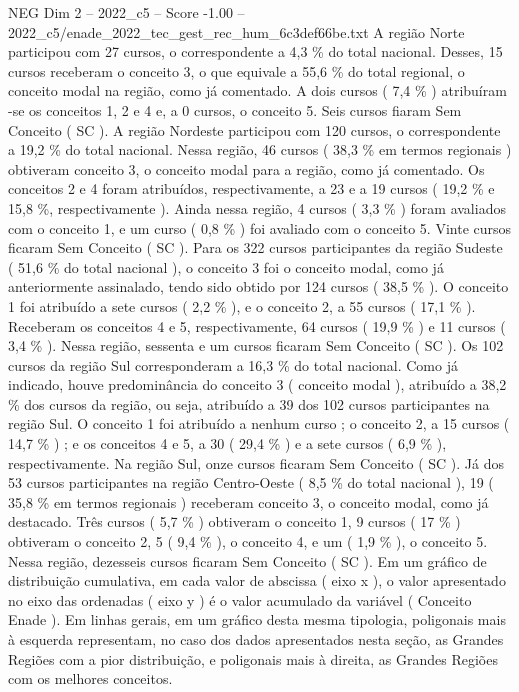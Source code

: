 \begin{textsample}{NEG Dim 2 – 2022\_c5 – Score -1.00 – 2022\_c5/enade\_2022\_tec\_gest\_rec\_hum\_6c3def66be.txt}
A região Norte participou com 27 cursos, o correspondente a 4,3 \% do total nacional.
Desses, 15 cursos receberam o conceito 3, o que equivale a 55,6 \% do total regional, o conceito modal na região, como já comentado.
A dois cursos ( 7,4 \% ) atribuíram -se os conceitos 1, 2 e 4 e, a 0 cursos, o conceito 5.
Seis cursos fiaram Sem Conceito ( SC ).
A região Nordeste participou com 120 cursos, o correspondente a 19,2 \% do total nacional.
Nessa região, 46 cursos ( 38,3 \% em termos regionais ) obtiveram conceito 3, o conceito modal para a região, como já comentado.
Os conceitos 2 e 4 foram atribuídos, respectivamente, a 23 e a 19 cursos ( 19,2 \% e 15,8 \%, respectivamente ).
Ainda nessa região, 4 cursos ( 3,3 \% ) foram avaliados com o conceito 1, e um curso ( 0,8 \% ) foi avaliado com o conceito 5.
Vinte cursos ficaram Sem Conceito ( SC ).
Para os 322 cursos participantes da região Sudeste ( 51,6 \% do total nacional ), o conceito 3 foi o conceito modal, como já anteriormente assinalado, tendo sido obtido por 124 cursos ( 38,5 \% ).
O conceito 1 foi atribuído a sete cursos ( 2,2 \% ), e o conceito 2, a 55 cursos ( 17,1 \% ).
Receberam os conceitos 4 e 5, respectivamente, 64 cursos ( 19,9 \% ) e 11 cursos ( 3,4 \% ).
Nessa região, sessenta e um cursos ficaram Sem Conceito ( SC ).
Os 102 cursos da região Sul corresponderam a 16,3 \% do total nacional.
Como já indicado, houve predominância do conceito 3 ( conceito modal ), atribuído a 38,2 \% dos cursos da região, ou seja, atribuído a 39 dos 102 cursos participantes na região Sul.
O conceito 1 foi atribuído a nenhum curso ; o conceito 2, a 15 cursos ( 14,7 \% ) ; e os conceitos 4 e 5, a 30 ( 29,4 \% ) e a sete cursos ( 6,9 \% ), respectivamente.
Na região Sul, onze cursos ficaram Sem Conceito ( SC ).
Já dos 53 cursos participantes na região Centro-Oeste ( 8,5 \% do total nacional ), 19 ( 35,8 \% em termos regionais ) receberam conceito 3, o conceito modal, como já destacado.
Três cursos ( 5,7 \% ) obtiveram o conceito 1, 9 cursos ( 17 \% ) obtiveram o conceito 2, 5 ( 9,4 \% ), o conceito 4, e um ( 1,9 \% ), o conceito 5.
Nessa região, dezesseis cursos ficaram Sem Conceito ( SC ).
Em um gráfico de distribuição cumulativa, em cada valor de abscissa ( eixo x ), o valor apresentado no eixo das ordenadas ( eixo y ) é o valor acumulado da variável ( Conceito Enade ).
Em linhas gerais, em um gráfico desta mesma tipologia, poligonais mais à esquerda representam, no caso dos dados apresentados nesta seção, as Grandes Regiões com a pior distribuição, e poligonais mais à direita, as Grandes Regiões com os melhores conceitos.

\end{textsample}
